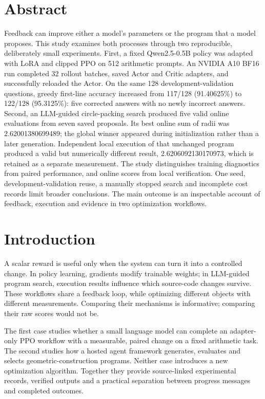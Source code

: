 \section*{Abstract}
Feedback can improve either a model's parameters or the program that a model proposes. This study examines both processes through two reproducible, deliberately small experiments. First, a fixed Qwen2.5-0.5B policy was adapted with LoRA and clipped PPO on 512 arithmetic prompts. An NVIDIA A10 BF16 run completed 32 rollout batches, saved Actor and Critic adapters, and successfully reloaded the Actor. On the same 128 development-validation questions, greedy first-line accuracy increased from 117/128 (91.40625\%) to 122/128 (95.3125\%): five corrected answers with no newly incorrect answers. Second, an LLM-guided circle-packing search produced five valid online evaluations from seven saved proposals. Its best online sum of radii was 2.62001380699489; the global winner appeared during initialization rather than a later generation. Independent local execution of that unchanged program produced a valid but numerically different result, 2.6206092130170973, which is retained as a separate measurement. The study distinguishes training diagnostics from paired performance, and online scores from local verification. One seed, development-validation reuse, a manually stopped search and incomplete cost records limit broader conclusions. The main outcome is an inspectable account of feedback, execution and evidence in two optimization workflows.

\section{Introduction}
A scalar reward is useful only when the system can turn it into a controlled change. In policy learning, gradients modify trainable weights; in LLM-guided program search, execution results influence which source-code changes survive. These workflows share a feedback loop, while optimizing different objects with different measurements. Comparing their mechanisms is informative; comparing their raw scores would not be.

The first case studies whether a small language model can complete an adapter-only PPO workflow with a measurable, paired change on a fixed arithmetic task. The second studies how a hosted agent framework generates, evaluates and selects geometric-construction programs. Neither case introduces a new optimization algorithm. Together they provide source-linked experimental records, verified outputs and a practical separation between progress messages and completed outcomes.


